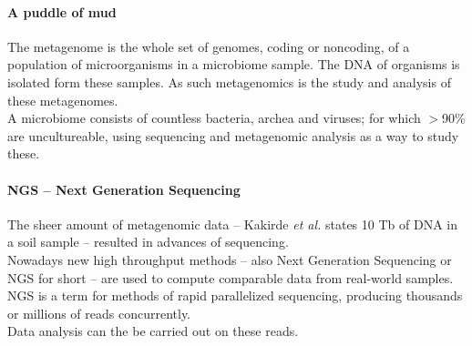 \documentclass[twocolumn]{bmcart}%
\begin{document}
\paragraph*{A puddle of mud}
The metagenome is the whole set of genomes, coding or noncoding, of a population of microorganisms in a microbiome sample. The DNA of organisms is isolated form these samples. As such metagenomics is the study and analysis of these metagenomes\cite{handelsman2004metagenomics}.\\
A microbiome consists of countless bacteria, archea and viruses; for which $>$90\% are uncultureable, using sequencing and metagenomic analysis as a way to study these.

\paragraph*{NGS -- Next Generation Sequencing}
The sheer amount of metagenomic data -- Kakirde \textit{et al.}\cite{KAKIRDE20101911} states 10 Tb of DNA in a soil sample -- resulted in advances of sequencing.\\
Nowadays new high throughput methods -- also Next Generation Sequencing or NGS for short -- are used to compute comparable data from real-world samples. NGS is a term for methods of rapid parallelized sequencing, producing thousands or millions of reads concurrently.\\
 Data analysis can the be carried out on these reads.
\end{document}
